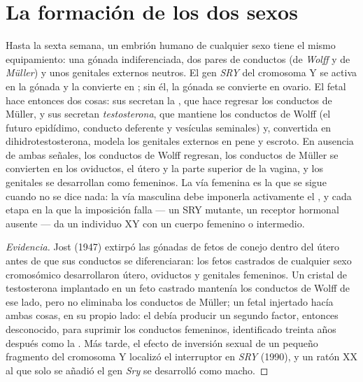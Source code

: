 \section{La formación de los dos sexos}

\begin{proposition}\label{prop:b2:mammal-reproduction:sex}
Hasta la sexta semana, un embrión humano de cualquier sexo tiene el mismo
equipamiento: una gónada indiferenciada, dos pares de conductos (de
\emph{Wolff} y de \emph{Müller}) y unos genitales externos neutros. El gen
\emph{SRY} del cromosoma Y se activa en la gónada y la convierte en
; sin él, la gónada se convierte en ovario. El  fetal
hace entonces dos cosas: sus  secretan la
\emph{}, que hace regresar los conductos de Müller,
y sus  secretan \emph{testosterona}, que mantiene los
conductos de Wolff (el futuro epidídimo, conducto deferente y vesículas
seminales) y, convertida en dihidrotestosterona, modela los genitales
externos en pene y escroto. En ausencia de ambas señales, los conductos
de Wolff regresan, los conductos de Müller se convierten en los
oviductos, el útero y la parte superior de la vagina, y los genitales se
desarrollan como femeninos. La vía femenina es la que se sigue cuando no
se dice nada: la vía masculina debe imponerla activamente el ,
y cada etapa en la que la imposición falla --- un SRY mutante, un
receptor hormonal ausente --- da un individuo XY con un cuerpo femenino
o intermedio.
\end{proposition}
\begin{proof}[Evidencia]
Jost (1947) extirpó las gónadas de fetos de conejo dentro del útero antes
de que sus conductos se diferenciaran: los fetos castrados de cualquier
sexo cromosómico desarrollaron útero, oviductos y genitales femeninos. Un
cristal de testosterona implantado en un feto castrado mantenía los
conductos de Wolff de ese lado, pero no eliminaba los conductos de
Müller; un  fetal injertado hacía ambas cosas, en su propio
lado: el  debía producir un segundo factor, entonces
desconocido, para suprimir los conductos femeninos, identificado treinta
años después como la . Más tarde, el efecto de
inversión sexual de un pequeño fragmento del cromosoma Y localizó el
interruptor en \emph{SRY} (1990), y un ratón XX al que solo se añadió el
gen \emph{Sry} se desarrolló como macho.
\end{proof}


